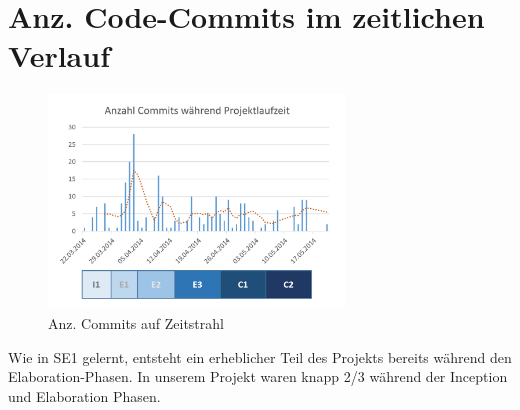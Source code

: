 	\section{Anz. Code-Commits im zeitlichen Verlauf}
        \begin{figure}
            \vspace{-25pt}
            \begin{center}
                \includegraphics[width=0.7\textwidth]{content/schlussbericht/images/commitspertime.png}
            \end{center}
            \vspace{-20pt}
            \caption{Anz. Commits auf Zeitstrahl}
        \end{figure}
        Wie in SE1 gelernt, entsteht ein erheblicher Teil des Projekts bereits während den Elaboration-Phasen. In unserem Projekt waren  knapp 2/3 während der Inception und Elaboration Phasen.

	